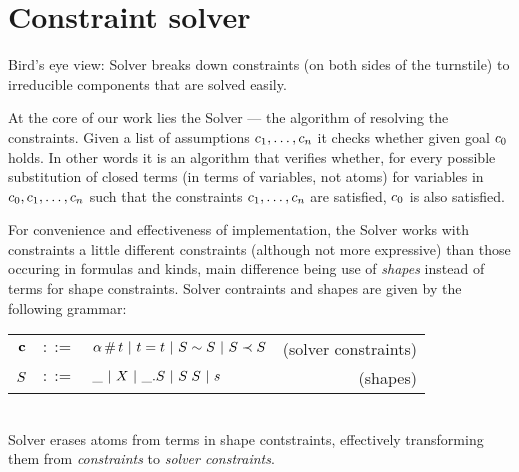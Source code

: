 \documentclass[english, mgr]{iithesis}
\begin{document}
\chapter{Constraint solver}
Bird's eye view: Solver breaks down constraints (on both sides of the turnstile)
to irreducible components that are solved easily.


At the core of our work lies the Solver
--- the algorithm of resolving the constraints.
Given a list of assumptions $c_1, \dots, c_n$ it checks whether
given goal $c_0$ holds.
In other words it is an algorithm that verifies whether,
for every possible substitution of closed terms (in terms of variables, not atoms)
for variables in $c_0, c_1, \dots, c_n$ such that the constraints
$c_1, \dots, c_n$ are satisfied, $c_0$ is also satisfied.

For convenience and effectiveness of implementation, the Solver works with
constraints a little different constraints (although not more expressive)
than those occuring in formulas and kinds,
main difference being use of \textit{shapes} instead of terms for shape constraints.
Solver contraints and shapes are given by the following grammar: \\
\begin{tabular}{rclr}
  $\mathbf{c}$ & $::=$ & $\alpha \,\#\, t
  \ |\  t = t
  \ |\  S \sim S
  \ |\  S \prec S$
      & (solver constraints) \\
  $S$      & $::=$ & $\_
                 \ |\   X
                 \ |\  \_. S
                 \ |\  S \; S
                 \ |\  s$
      & (shapes)
\end{tabular}\\
Solver erases atoms from terms in shape contstraints, effectively transforming
them from \textit{constraints} to \textit{solver constraints}.
\end{document}
